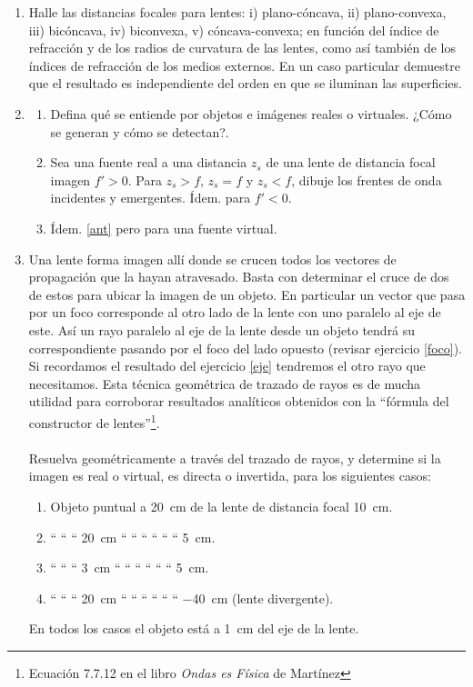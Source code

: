 \documentclass[11pt,spanish,a4paper]{article}
\begin{document}
\begin{enumerate}
\item \label{foco} Halle las distancias focales para lentes: i) plano-cóncava, ii) plano-convexa,
iii) bicóncava, iv) biconvexa, v) cóncava-convexa; en función del índice de refracción y
de los radios de curvatura de las lentes, como así también de los índices de refracción de
los medios externos.
En un caso particular demuestre que el resultado es independiente del orden en que se iluminan las superficies.


\item
\begin{enumerate}
	\item Defina qué se entiende por objetos e imágenes reales o virtuales.
		¿Cómo se generan y cómo se detectan?.
	\item \label{ant} Sea una fuente real a una distancia \(z_s\) de una lente de distancia focal imagen \(f'>0\).
		Para \(z_s> f\), \(z_s= f\) y \(z_s< f\), dibuje los frentes de onda incidentes y emergentes.
		Ídem. para \(f'< 0\).
	\item Ídem. \ref{ant} pero para una fuente virtual.
\end{enumerate}



\item \label{geom} Una lente forma imagen allí donde se crucen todos los vectores de propagación que la hayan atravesado.
	Basta con determinar el cruce de dos de estos para ubicar la imagen de un objeto.
	En particular un vector que pasa por un foco corresponde al otro lado de la lente con uno paralelo al eje de este.
	Así un rayo paralelo al eje de la lente desde un objeto tendrá su correspondiente pasando por el foco del lado opuesto (revisar ejercicio \ref{foco}).
	Si recordamos el resultado del ejercicio \ref{eje} tendremos el otro rayo que necesitamos. 
	Esta técnica geométrica de trazado de rayos es de mucha utilidad para corroborar resultados analíticos obtenidos con la ``fórmula del constructor de lentes''\footnote{Ecuación 7.7.12 en el libro \emph{Ondas es Física} de Martínez}.\\ \\
	Resuelva geométricamente a través del trazado de rayos, y determine si la imagen es real o virtual, es directa o invertida, para los siguientes casos:
	\begin{enumerate}
		\item Objeto puntual a \SI{20}{cm} de la lente de distancia focal \SI{10}{cm}.
		\item `` `` `` \SI{20}{cm} `` `` `` `` `` `` \SI{5}{cm}.
		\item `` `` `` \SI{3}{cm} `` `` `` `` `` `` \SI{5}{cm}.
		\item `` `` `` \SI{20}{cm} `` `` `` `` `` `` \SI{-40}{cm} (lente divergente).
	\end{enumerate}
	En todos los casos el objeto está a \SI{1}{cm} del eje de la lente.



\end{enumerate}
\end{document}
